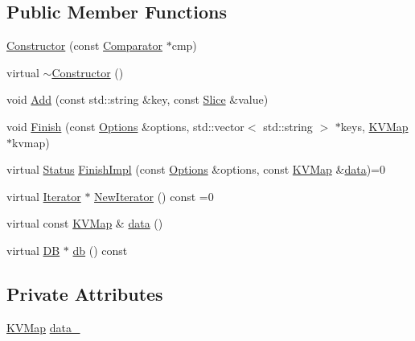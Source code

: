\subsection*{Public Member Functions}
\begin{DoxyCompactItemize}
\item 
\hyperlink{classleveldb_1_1_constructor_a5f4d21512e279769e881b2ae85129f08}{Constructor} (const \hyperlink{structleveldb_1_1_comparator}{Comparator} $\ast$cmp)
\item 
virtual \hyperlink{classleveldb_1_1_constructor_a643f9e1fc58b988f41b2a081398b04a1}{$\sim$\+Constructor} ()
\item 
void \hyperlink{classleveldb_1_1_constructor_a5bb35f87d196065b8357200922aae69f}{Add} (const std\+::string \&key, const \hyperlink{classleveldb_1_1_slice}{Slice} \&value)
\item 
void \hyperlink{classleveldb_1_1_constructor_a5c7f63378f8834cac3be93040e0e49fc}{Finish} (const \hyperlink{structleveldb_1_1_options}{Options} \&options, std\+::vector$<$ std\+::string $>$ $\ast$keys, \hyperlink{namespaceleveldb_aac1e50450147be263e08252c6700f7a7}{K\+V\+Map} $\ast$kvmap)
\item 
virtual \hyperlink{classleveldb_1_1_status}{Status} \hyperlink{classleveldb_1_1_constructor_a0f11e251cfbe990b5b0a4e7040923189}{Finish\+Impl} (const \hyperlink{structleveldb_1_1_options}{Options} \&options, const \hyperlink{namespaceleveldb_aac1e50450147be263e08252c6700f7a7}{K\+V\+Map} \&\hyperlink{classleveldb_1_1_constructor_a55a0363200d6e86d8beb3b15b75e3824}{data})=0
\item 
virtual \hyperlink{classleveldb_1_1_iterator}{Iterator} $\ast$ \hyperlink{classleveldb_1_1_constructor_a362b24b7194f605b655f5a136e0ae43c}{New\+Iterator} () const =0
\item 
virtual const \hyperlink{namespaceleveldb_aac1e50450147be263e08252c6700f7a7}{K\+V\+Map} \& \hyperlink{classleveldb_1_1_constructor_a55a0363200d6e86d8beb3b15b75e3824}{data} ()
\item 
virtual \hyperlink{classleveldb_1_1_d_b}{D\+B} $\ast$ \hyperlink{classleveldb_1_1_constructor_a207d6002cdb7ead23cecf6cfb4350a80}{db} () const 
\end{DoxyCompactItemize}
\subsection*{Private Attributes}
\begin{DoxyCompactItemize}
\item 
\hyperlink{namespaceleveldb_aac1e50450147be263e08252c6700f7a7}{K\+V\+Map} \hyperlink{classleveldb_1_1_constructor_ab7a0cf797b5c3e45824162152b900c9d}{data\+\_\+}
\end{DoxyCompactItemize}


